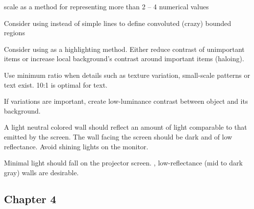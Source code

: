 \begin{compactenum}

    \item {} scale as a method for representing more than 2 -- 4 numerical
    values

    \item Consider using  instead of simple lines to define
    convoluted (crazy) bounded regions

    \item Consider using  as a highlighting method. Either
    reduce contrast of unimportant items or increase local background's
    contrast around important items (haloing).

    \item Use  minimum  ratio when details such as
    texture variation, small-scale patterns or text exist. 10:1 is optimal
    for text.

    \item If  variations are important, create
        low-luminance contrast between object and its background.

    \item A light neutral colored wall  should reflect
        an amount of light comparable to that emitted by the screen.
        The wall facing the screen should be dark and of low reflectance.
        Avoid shining lights on the monitor.

    \item Minimal light should fall on the projector screen. ,
        low-reflectance (mid to dark gray) walls are desirable.

\end{compactenum}

\subsection{Chapter 4}


